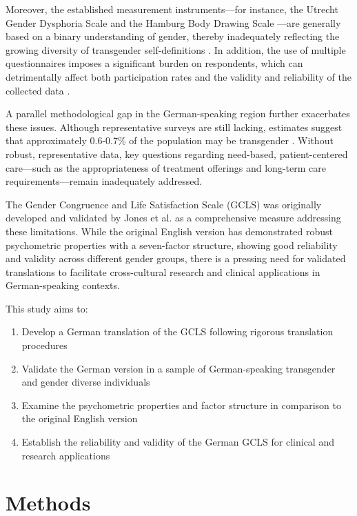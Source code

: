 \documentclass[man,floatsintext,12pt]{apa7}
\begin{document}
Moreover, the established measurement instruments---for instance, the
Utrecht Gender Dysphoria Scale \citep{cohen1997} and the Hamburg Body
Drawing Scale \citep{becker2016}---are generally based on a binary
understanding of gender, thereby inadequately reflecting the growing
diversity of transgender self-definitions \citep{beek2015, clarke2018}.
In addition, the use of multiple questionnaires imposes a significant
burden on respondents, which can detrimentally affect both participation
rates and the validity and reliability of the collected data
\citep{rolstad2011, turner2007}.

A parallel methodological gap in the German-speaking region further
exacerbates these issues. Although representative surveys are still
lacking, estimates suggest that approximately 0.6-0.7\% of the
population may be transgender \citep{beek2015, cohen1997}. Without
robust, representative data, key questions regarding need-based,
patient-centered care---such as the appropriateness of treatment
offerings and long-term care requirements---remain inadequately
addressed.

The Gender Congruence and Life Satisfaction Scale (GCLS) was originally
developed and validated by Jones et al. \citeyearpar{jones2019} as a
comprehensive measure addressing these limitations. While the original
English version has demonstrated robust psychometric properties with a
seven-factor structure, showing good reliability and validity across
different gender groups, there is a pressing need for validated
translations to facilitate cross-cultural research and clinical
applications in German-speaking contexts.

This study aims to:

\begin{enumerate}
\def\labelenumi{\arabic{enumi}.}
\tightlist
\item
  Develop a German translation of the GCLS following rigorous
  translation procedures
\item
  Validate the German version in a sample of German-speaking transgender
  and gender diverse individuals
\item
  Examine the psychometric properties and factor structure in comparison
  to the original English version
\item
  Establish the reliability and validity of the German GCLS for clinical
  and research applications
\end{enumerate}

\section{Methods}\label{methods}
\end{document}
